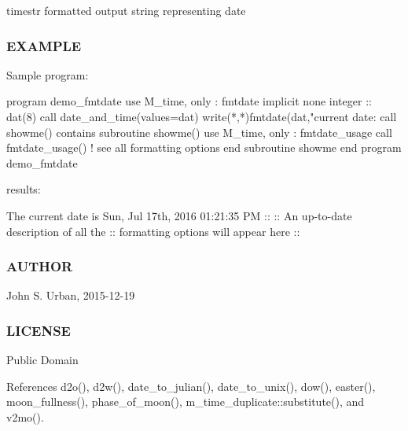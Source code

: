 timestr formatted output string representing date

\subsubsection*{E\+X\+A\+M\+P\+LE}

\begin{DoxyVerb}Sample program:

 program demo_fmtdate
 use M_time, only : fmtdate
 implicit none
 integer :: dat(8)
    call date_and_time(values=dat)
    write(*,*)fmtdate(dat,"current date: %
    call showme()
 contains
 subroutine showme()
    use M_time, only : fmtdate_usage
    call fmtdate_usage() ! see all formatting options
 end subroutine showme
 end program demo_fmtdate

results:

   The current date is Sun, Jul 17th, 2016 01:21:35 PM
    ::
    :: An up-to-date description of all the
    :: formatting options will appear here
    ::
\end{DoxyVerb}


\subsubsection*{A\+U\+T\+H\+OR}

John S. Urban, 2015-\/12-\/19 \subsubsection*{L\+I\+C\+E\+N\+SE}

Public Domain 

References d2o(), d2w(), date\+\_\+to\+\_\+julian(), date\+\_\+to\+\_\+unix(), dow(), easter(), moon\+\_\+fullness(), phase\+\_\+of\+\_\+moon(), m\+\_\+time\+\_\+duplicate\+::substitute(), and v2mo().

